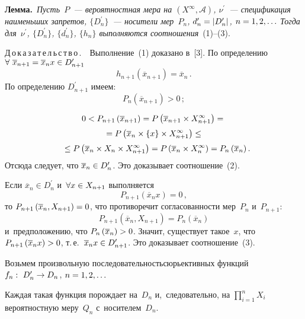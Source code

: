 \begin{multicols}{2}
    \smallskip

    \noindent
    \textbf{Лемма.}\ \textit{Пусть~$P$~--- вероятностная мера на $(X^\infty,
\mathcal{A})$, $\nu^\prime$~--- спецификация наименьших запретов,
$\{D_n^\prime\}$~--- носители мер~$P_n$, $d_n^\prime \hm= \vert
D_n^\prime\vert$,  $n\hm=1,2,\ldots$ Тогда для~$\nu^\prime$, $\{D_n^\prime\}$,
$\{d_n^\prime\}$, $\{h_n\}$ выполняются соотношения}~(1)--(3).

    \smallskip

    \noindent
    Д\,о\,к\,а\,з\,а\,т\,е\,л\,ь\,с\,т\,в\,о\,.\ \  Выполнение~(1) доказано в~[3]. По
определению $\forall\ \overline{x}_{n+1}\hm= \overline{x}_nx\hm\in
D_{n+1}^\prime$
    $$
    h_{n+1}\left(\overline{x}_{n+1}\right) =\overline{x}_n\,.
    $$
По определению $D_{n+1}^\prime$ имеем:
 $$
 P_n\left( \overline{x}_{n+1}\right) >0\,;
 $$

 \vspace*{-14pt}

 \noindent
\begin{multline*}
0<P_{n+1}\left(\overline{x}_{n+1}\right) = P\left( \overline{x}_{n+1}\times
X^\infty_{n+1}\right) = {}\\[2pt]
{}=P\left(\overline{x}_n \times \{x\} \times
X^\infty_{n+1}\right) \leq {}\\[2pt]
{}\leq P\left(\overline{x}_n \times X_n \times X^\infty_{n+1}\right) =
P\left(\overline{x}_n \times X_n^\infty \right) =P_n\left(\overline{x}_n\right).\hspace*{-5.73422pt}
\end{multline*}
Отсюда следует, что $\overline{x}_n\hm\in D_n^\prime$. Это доказывает
соотношение~(2).

    Если $\overline{x}_n \in D_n^\prime$ и~$\forall x\hm\in X_{n+1}$
выполняется
    $$
    P_{n+1}\left(\overline{x}_nx\right)=0\,,
    $$
то $P_{n+1}\left(\overline{x}_n, X_{n+1}\right)\hm=0$, что противоречит
согласованности мер~$P_n$ и~$P_{n+1}$:
$$
P_{n+1}\left(\overline{x}_n, X_{n+1}\right) =P_n\left(\overline{x}_n\right)
$$
и~предположению, что $P_n\left(\overline{x}_n\right)\hm>0$. Значит,
существует такое~$x$, что $P_{n+1}\left(\overline{x}_n x\right) \hm>0$, т.\,е.\
$\overline{x}_n x\hm\in D^\prime_{n+1}$. Это доказывает соотношение~(3).

    Возьмем произвольную последовательность\linebreak сюрьективных функций
    $f_n:\ D_n^\prime \hm\to D_n$, $n\hm=1, 2,\ldots$

    Каждая такая функция порождает на~$D_n$ и,~следовательно, на
$\prod\limits_{i=1}^n X_i$ вероятностную меру~$Q_n$ с~носителем~$D_n$.


\end{multicols}
